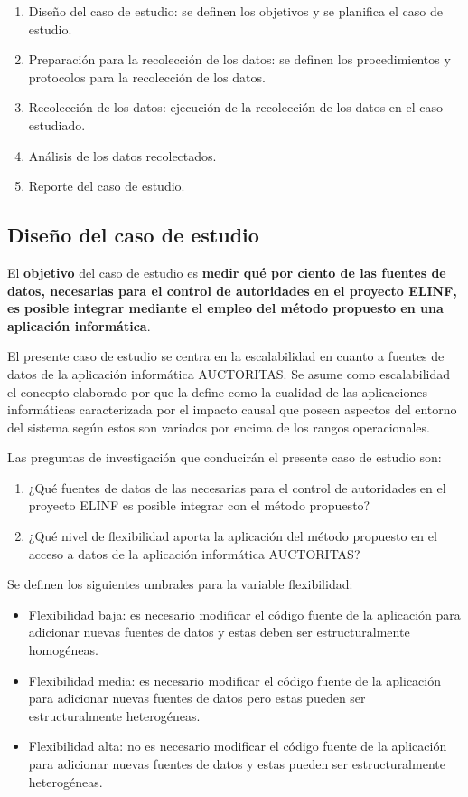 \begin{enumerate}
\item Diseño del caso de estudio: se definen los objetivos y se planifica el caso de estudio.
\item Preparación para la recolección de los datos: se definen los procedimientos y protocolos para la recolección de los datos.
\item Recolección de los datos: ejecución de la recolección de los datos en el caso estudiado.
\item Análisis de los datos recolectados.
\item Reporte del caso de estudio.
\end{enumerate}

\subsection{Diseño del caso de estudio}
El \textbf{objetivo} del caso de estudio es \textbf{medir qué por ciento de las fuentes de datos, necesarias para el control de autoridades en el proyecto ELINF, es posible integrar mediante el empleo del método propuesto en una aplicación informática}. 

El presente caso de estudio se centra en la escalabilidad en cuanto a fuentes de datos de la aplicación informática AUCTORITAS. Se asume como escalabilidad el concepto elaborado por \cite{duboc2006framework} que la define como la cualidad de las aplicaciones informáticas caracterizada por el impacto causal que poseen aspectos del entorno del sistema según estos son variados por encima de los rangos operacionales.

Las preguntas de investigación que conducirán el presente caso de estudio son:

\begin{enumerate}
\item ¿Qué fuentes de datos de las necesarias para el control de autoridades en el proyecto ELINF es posible integrar con el método propuesto?
\item ¿Qué nivel de flexibilidad aporta la aplicación del método propuesto en el acceso a datos de la aplicación informática AUCTORITAS?
\end{enumerate}

Se definen los siguientes umbrales para la variable flexibilidad:

\begin{itemize}
\item Flexibilidad baja: es necesario modificar el código fuente de la aplicación para adicionar nuevas fuentes de datos y estas deben ser estructuralmente homogéneas.
\item Flexibilidad media: es necesario modificar el código fuente de la aplicación para adicionar nuevas fuentes de datos pero estas pueden ser estructuralmente heterogéneas.
\item Flexibilidad alta: no es necesario modificar el código fuente de la aplicación para adicionar nuevas fuentes de datos y estas pueden ser estructuralmente heterogéneas.
\end{itemize}

